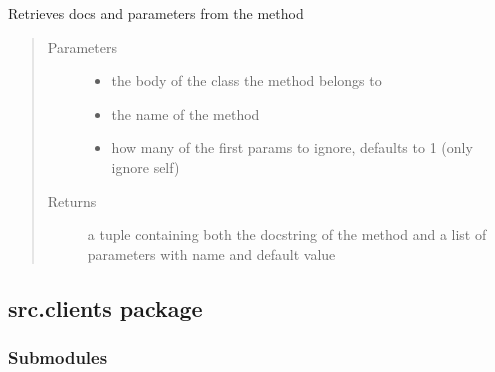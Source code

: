\documentclass[letterpaper,10pt,english]{sphinxmanual}
\begin{document}

\begin{fulllineitems}
\label{\detokenize{src.blueprints:src.blueprints.views.retrieve_method_info}}
Retrieves docs and parameters from the method
\begin{quote}\begin{description}
\item[{Parameters}] \leavevmode\begin{itemize}
\item {} 
 \textendash{} the body of the class the method belongs to

\item {} 
 \textendash{} the name of the method

\item {} 
 \textendash{} how many of the first params to ignore, defaults to 1 (only ignore self)

\end{itemize}

\item[{Returns}] \leavevmode
a tuple containing both the docstring of the method and a list of parameters with name and default value

\end{description}\end{quote}

\end{fulllineitems}



\subsection{src.clients package}
\label{\detokenize{src.clients:src-clients-package}}\label{\detokenize{src.clients::doc}}

\subsubsection{Submodules}
\label{\detokenize{src.clients:submodules}}
\end{document}
